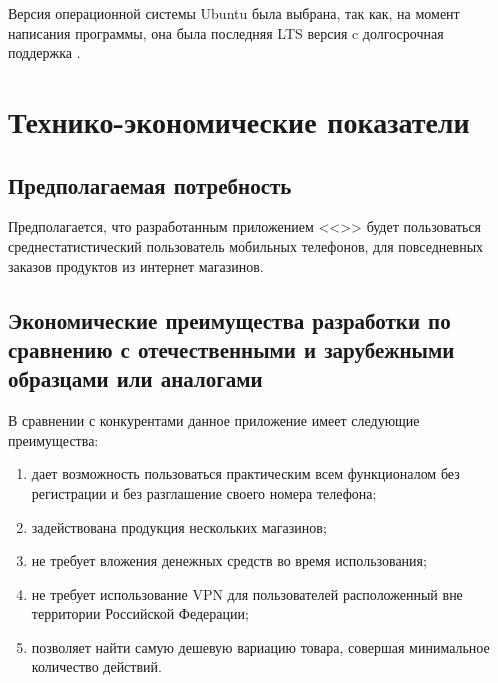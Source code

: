 \documentclass[a4paper,12pt]{article}
\begin{document}
  Версия операционной системы Ubuntu была выбрана, так как, на момент написания программы,
  она была последняя LTS версия c долгосрочная поддержка \cite{releases}.

  \newpage
  \section{Технико-экономические показатели}
  \subsection{Предполагаемая потребность}
  Предполагается, что разработанным приложением <<\CRTname>> будет пользоваться среднестатистический пользователь мобильных телефонов,
  для повседневных заказов продуктов из интернет магазинов.

  \subsection{Экономические преимущества разработки по сравнению с отечественными и зарубежными образцами или аналогами}
  В сравнении с конкурентами данное приложение имеет следующие преимущества:
  \begin{enumerate}
    \item дает возможность пользоваться практическим всем функционалом без регистрации и без разглашение своего номера телефона;
    \item задействована продукция нескольких магазинов;
    \item не требует вложения денежных средств во время использования;
    \item не требует использование VPN для пользователей расположенный вне территории Российской Федерации;
    \item позволяет найти самую дешевую вариацию товара, совершая минимальное количество действий.
  \end{enumerate}
\end{document}
